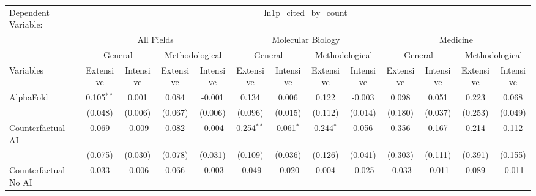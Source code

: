 \begingroup
\centering
\begin{tabular}{lcccccccccccc}
   \tabularnewline \midrule \midrule
   Dependent Variable: & \multicolumn{12}{c}{ln1p\_cited\_by\_count}\\
 & \multicolumn{4}{c}{All Fields} & \multicolumn{4}{c}{Molecular Biology} & \multicolumn{4}{c}{Medicine} \\
\cmidrule(lr){2-5} \cmidrule(lr){6-9} \cmidrule(lr){10-13}
 & \multicolumn{2}{c}{General} & \multicolumn{2}{c}{Methodological} & \multicolumn{2}{c}{General} & \multicolumn{2}{c}{Methodological} & \multicolumn{2}{c}{General} & \multicolumn{2}{c}{Methodological} \\
\cmidrule(lr){2-3} \cmidrule(lr){4-5} \cmidrule(lr){6-7} \cmidrule(lr){8-9} \cmidrule(lr){10-11} \cmidrule(lr){12-13}
Variables & \multicolumn{1}{c}{Extensive} & \multicolumn{1}{c}{Intensive} & \multicolumn{1}{c}{Extensive} & \multicolumn{1}{c}{Intensive} & \multicolumn{1}{c}{Extensive} & \multicolumn{1}{c}{Intensive} & \multicolumn{1}{c}{Extensive} & \multicolumn{1}{c}{Intensive} & \multicolumn{1}{c}{Extensive} & \multicolumn{1}{c}{Intensive} & \multicolumn{1}{c}{Extensive} & \multicolumn{1}{c}{Intensive} \\
\cmidrule(lr){1-1}\cmidrule(lr){2-2} \cmidrule(lr){3-3} \cmidrule(lr){4-4} \cmidrule(lr){5-5} \cmidrule(lr){6-6} \cmidrule(lr){7-7} \cmidrule(lr){8-8} \cmidrule(lr){9-9} \cmidrule(lr){10-10} \cmidrule(lr){11-11} \cmidrule(lr){12-12} \cmidrule(lr){13-13}
   AlphaFold                                & 0.105$^{**}$ & 0.001    & 0.084   & -0.001   & 0.134        & 0.006         & 0.122       & -0.003       & 0.098   & 0.051         & 0.223   & 0.068\\   
                                            & (0.048)      & (0.006)  & (0.067) & (0.006)  & (0.096)      & (0.015)       & (0.112)     & (0.014)      & (0.180) & (0.037)       & (0.253) & (0.049)\\   
   Counterfactual AI                        & 0.069        & -0.009   & 0.082   & -0.004   & 0.254$^{**}$ & 0.061$^{*}$   & 0.244$^{*}$ & 0.056        & 0.356   & 0.167         & 0.214   & 0.112\\   
                                            & (0.075)      & (0.030)  & (0.078) & (0.031)  & (0.109)      & (0.036)       & (0.126)     & (0.041)      & (0.303) & (0.111)       & (0.391) & (0.155)\\   
   Counterfactual No AI                     & 0.033        & -0.006   & 0.066   & -0.003   & -0.049       & -0.020        & 0.004       & -0.025       & -0.033  & -0.011        & 0.089   & -0.011\\   

\end{tabular}
